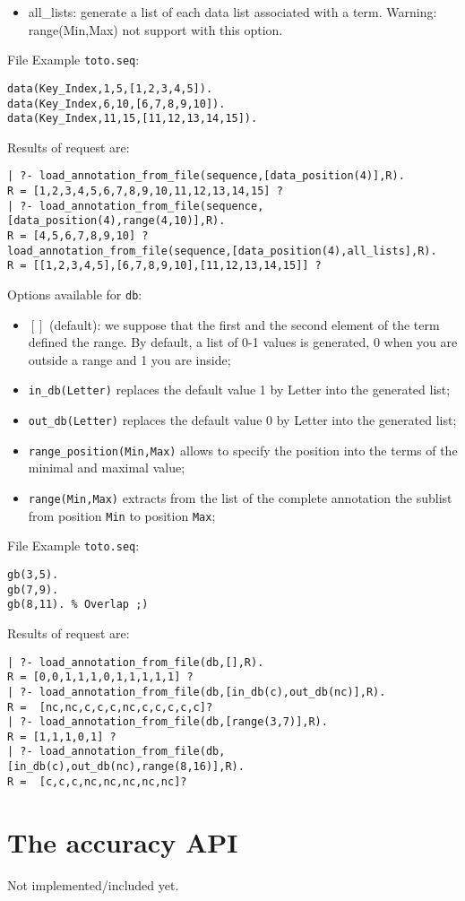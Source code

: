 \documentclass{book}
\begin{document}
\begin{itemize}
\begin{itemize}
\item all\_lists: generate a list of each data list associated with a term. Warning: range(Min,Max) not support with this option.
\end{itemize}
File Example \texttt{toto.seq}:
\begin{verbatim}
data(Key_Index,1,5,[1,2,3,4,5]).
data(Key_Index,6,10,[6,7,8,9,10]).
data(Key_Index,11,15,[11,12,13,14,15]).
\end{verbatim}
Results of request are:
\begin{verbatim}
| ?- load_annotation_from_file(sequence,[data_position(4)],R).
R = [1,2,3,4,5,6,7,8,9,10,11,12,13,14,15] ?
| ?- load_annotation_from_file(sequence,[data_position(4),range(4,10)],R).
R = [4,5,6,7,8,9,10] ?
load_annotation_from_file(sequence,[data_position(4),all_lists],R).
R = [[1,2,3,4,5],[6,7,8,9,10],[11,12,13,14,15]] ?
\end{verbatim}

Options available for \texttt{db}:
\begin{itemize}
\item $[]$ (default): we suppose that the first and the second element of the term defined the range. By default, a list of 0-1 
values is generated, 0 when you are outside a range and 1 you are inside;
\item \texttt{in\_db(Letter)} replaces the default value 1 by Letter into the generated list;
\item \texttt{out\_db(Letter)} replaces the default value 0 by Letter into the generated list;
\item \texttt{range\_position(Min,Max)} allows to specify the position into the terms of the minimal and maximal value;
\item \texttt{range(Min,Max)} extracts from the list of the complete annotation the sublist from position \texttt{Min} to
position \texttt{Max};
\end{itemize}
File Example \texttt{toto.seq}:
\begin{verbatim}
gb(3,5).
gb(7,9).
gb(8,11). % Overlap ;)
\end{verbatim}
Results of request are:
\begin{verbatim}
| ?- load_annotation_from_file(db,[],R).
R = [0,0,1,1,1,0,1,1,1,1,1] ?
| ?- load_annotation_from_file(db,[in_db(c),out_db(nc)],R).
R =  [nc,nc,c,c,c,nc,c,c,c,c,c]?
| ?- load_annotation_from_file(db,[range(3,7)],R).
R = [1,1,1,0,1] ?
| ?- load_annotation_from_file(db,[in_db(c),out_db(nc),range(8,16)],R).
R =  [c,c,c,nc,nc,nc,nc,nc]?
\end{verbatim}


\end{itemize}

\section{The accuracy API}

Not implemented/included yet.


\printindex
\end{document}
